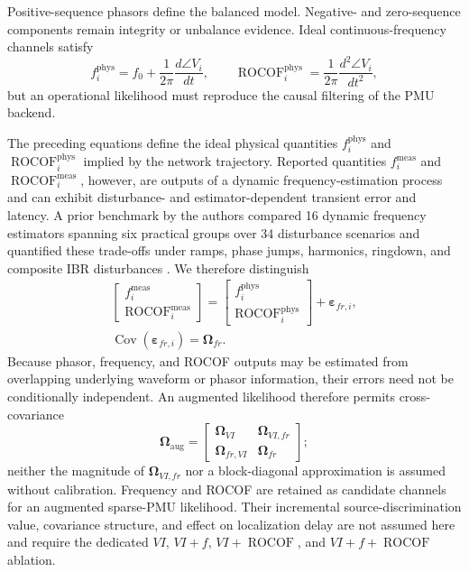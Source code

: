 \documentclass{ieeeaccess}
\begin{document}
Positive-sequence phasors define the balanced model. Negative- and zero-sequence components remain integrity or unbalance evidence. Ideal continuous-frequency channels satisfy
\begin{equation}
 f_i^{\mathrm{phys}}=f_0+\frac{1}{2\pi}\frac{d\angle V_i}{dt},\qquad
 \operatorname{ROCOF}_i^{\mathrm{phys}}=\frac{1}{2\pi}\frac{d^2\angle V_i}{dt^2},
\end{equation}
but an operational likelihood must reproduce the causal filtering of the PMU backend.

The preceding equations define the ideal physical quantities $f_i^{\mathrm{phys}}$ and $\operatorname{ROCOF}_i^{\mathrm{phys}}$ implied by the network trajectory. Reported quantities $f_i^{\mathrm{meas}}$ and $\operatorname{ROCOF}_i^{\mathrm{meas}}$, however, are outputs of a dynamic frequency-estimation process and can exhibit disturbance- and estimator-dependent transient error and latency. A prior benchmark by the authors compared 16 dynamic frequency estimators spanning six practical groups over 34 disturbance scenarios and quantified these trade-offs under ramps, phase jumps, harmonics, ringdown, and composite IBR disturbances \cite{Mayorga2026FrequencyBenchmark}. We therefore distinguish
\begin{equation}
 \begin{gathered}
 \begin{bmatrix}f_i^{\mathrm{meas}}\\\operatorname{ROCOF}_i^{\mathrm{meas}}\end{bmatrix}
 =
 \begin{bmatrix}f_i^{\mathrm{phys}}\\\operatorname{ROCOF}_i^{\mathrm{phys}}\end{bmatrix}
 +\bm\varepsilon_{fr,i},\\
 \operatorname{Cov}(\bm\varepsilon_{fr,i})=\bm\Omega_{fr}.
 \end{gathered}
\end{equation}
Because phasor, frequency, and ROCOF outputs may be estimated from overlapping underlying waveform or phasor information, their errors need not be conditionally independent. An augmented likelihood therefore permits cross-covariance
\begin{equation}
 \bm\Omega_{\mathrm{aug}}=
 \begin{bmatrix}
 \bm\Omega_{VI}&\bm\Omega_{VI,fr}\\
 \bm\Omega_{fr,VI}&\bm\Omega_{fr}
 \end{bmatrix};
\end{equation}
neither the magnitude of $\bm\Omega_{VI,fr}$ nor a block-diagonal approximation is assumed without calibration. Frequency and ROCOF are retained as candidate channels for an augmented sparse-PMU likelihood. Their incremental source-discrimination value, covariance structure, and effect on localization delay are not assumed here and require the dedicated $VI$, $VI+f$, $VI+\operatorname{ROCOF}$, and $VI+f+\operatorname{ROCOF}$ ablation.
\end{document}

